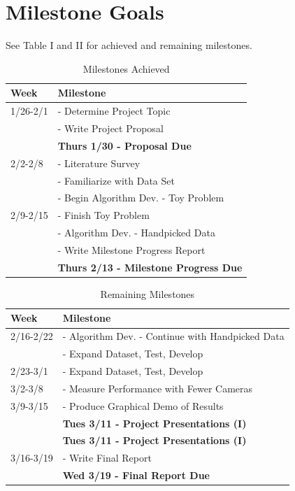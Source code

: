 \documentclass[journal]{IEEEtran}
\begin{document}
\section{Milestone Goals}
	See Table I and II for achieved and remaining milestones.
	\begin{table}[H]
		\renewcommand{\arraystretch}{1.3}
		\caption{Milestones Achieved}
		\label{table_example}
		\centering
			\begin{tabular}{l|l}
				\hline
				\bfseries Week & \bfseries Milestone\\
				\hline
				1/26-2/1 & - Determine Project Topic\\
						 & - Write Project Proposal\\
						 & \textbf{Thurs 1/30 - Proposal Due}\\
				\hline
				2/2-2/8 & - Literature Survey\\
					       & - Familiarize with Data Set\\
					       & - Begin Algorithm Dev. - Toy Problem\\
				\hline
				2/9-2/15 & - Finish Toy Problem\\
						 & - Algorithm Dev. - Handpicked Data\\
						 & - Write Milestone Progress Report\\
						 & \textbf{Thurs 2/13 - Milestone Progress Due}\\
				\hline
			\end{tabular}
	\end{table}
	\begin{table}[H]
	\renewcommand{\arraystretch}{1.3}
	\caption{Remaining Milestones}
	\label{table_example_2}
	\centering
		\begin{tabular}{l|l}
			\hline
			\bfseries Week & \bfseries Milestone\\
			\hline
			2/16-2/22 & - Algorithm Dev. - Continue with Handpicked Data\\
					   & - Expand Dataset, Test, Develop\\
			\hline
			2/23-3/1 & - Expand Dataset, Test, Develop\\
			\hline
			3/2-3/8 & - Measure Performance with Fewer Cameras\\
			\hline
			3/9-3/15 & - Produce Graphical Demo of Results\\
					 & \textbf{Tues 3/11 - Project Presentations (I)}\\
					 & \textbf{Tues 3/11 - Project Presentations (I)}\\
			\hline
			3/16-3/19 & - Write Final Report\\
					   & \textbf{Wed 3/19 - Final Report Due}\\
			\hline
		\end{tabular}
	\end{table}
	
\end{document}
